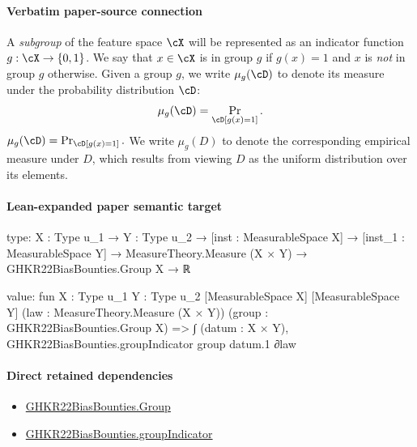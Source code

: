 \documentclass[10pt]{article}
\begin{document}
\paragraph{Verbatim paper-source connection}
\begin{ReviewVerbatim}
\begin{definition}[Subgroups]
A \emph{subgroup} of the feature space $\cX$ will be represented as an indicator function $g:\cX\rightarrow \{0,1\}$. We say that $x \in \cX$ is in group $g$ if $g(x) = 1$ and $x$ is \emph{not} in group $g$ otherwise. Given a group $g$, we write $\mu_g(\cD)$ to denote its measure under the probability distribution $\cD$:
\ifdraft
$$\mu_g(\cD) = \Pr_\cD[g(x) = 1].$$
\else $\mu_g(\cD) = \Pr_\cD[g(x) = 1].$ \fi
We write $\mu_g(D)$ to denote the corresponding empirical measure under $D$, which results from viewing $D$ as the uniform distribution over its elements.
\end{definition}
\end{ReviewVerbatim}



\paragraph{Lean-expanded paper semantic target}
\begin{ReviewVerbatim}
type:
{X : Type u_1} →
  {Y : Type u_2} →
    [inst : MeasurableSpace X] →
      [inst_1 : MeasurableSpace Y] → MeasureTheory.Measure (X × Y) → GHKR22BiasBounties.Group X → ℝ

value:
fun {X : Type u_1} {Y : Type u_2} [MeasurableSpace X] [MeasurableSpace Y] (law : MeasureTheory.Measure (X × Y))
    (group : GHKR22BiasBounties.Group X) =>
  ∫ (datum : X × Y), GHKR22BiasBounties.groupIndicator group datum.1 ∂law
\end{ReviewVerbatim}

\paragraph{Direct retained dependencies}
\begin{itemize}\raggedright
\item \hyperlink{paper-prerequisite-cc7214115b27106f}{GHKR22\allowbreak{}Bias\allowbreak{}Bounties.\allowbreak{}Group}
\item \hyperlink{paper-prerequisite-47614821994b2ed9}{GHKR22\allowbreak{}Bias\allowbreak{}Bounties.\allowbreak{}group\allowbreak{}Indicator}
\end{itemize}
\end{document}
